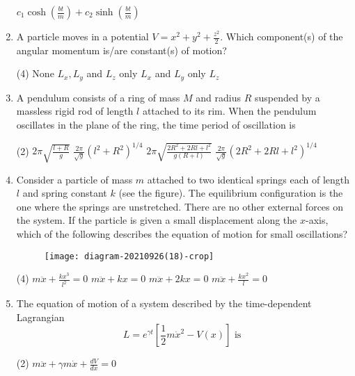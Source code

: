 \begin{enumerate}
\begin{tasks}
		\task[\textbf{D.}] $c_{1} \cosh \left(\frac{b t}{m}\right)+c_{2} \sinh \left(\frac{b t}{m}\right)$
	\end{tasks}	
	\item A particle moves in a potential $V=x^{2}+y^{2}+\frac{z^{2}}{2} .$ Which component(s) of the angular momentum is/are constant(s) of motion?
	{}
	\begin{tasks}(4)
		\task[\textbf{A.}] None
		\task[\textbf{B.}] $L_{x}, L_{y}$ and $L_{z}$
		\task[\textbf{C.}]  only $L_{x}$ and $L_{y}$
		\task[\textbf{D.}] only $L_{z}$
	\end{tasks}
	\item A pendulum consists of a ring of mass $M$ and radius $R$ suspended by a massless rigid rod of length $l$ attached to its rim. When the pendulum oscillates in the plane of the ring, the time period of oscillation is
	{}
	\begin{tasks}(2)
		\task[\textbf{A.}] $2 \pi \sqrt{\frac{l+R}{g}}$
		\task[\textbf{B.}] $\frac{2 \pi}{\sqrt{g}}\left(l^{2}+R^{2}\right)^{1 / 4}$
		\task[\textbf{C.}] $2 \pi \sqrt{\frac{2 R^{2}+2 R l+l^{2}}{g(R+l)}}$
		\task[\textbf{D.}] $\frac{2 \pi}{\sqrt{g}}\left(2 R^{2}+2 R l+l^{2}\right)^{1 / 4}$
	\end{tasks}	
	\item Consider a particle of mass $m$ attached to two identical springs each of length $l$ and spring constant $k$ (see the figure). The equilibrium configuration is the one where the springs are unstretched. There are no other external forces on the system. If the particle is given a small displacement along the $x$-axis, which of the following describes the equation of motion for small oscillations?
	{}
	\begin{figure}[H]
		\centering
		\texttt{[image: diagram-20210926(18)-crop]}
	\end{figure}
	\begin{tasks}(4)
		\task[\textbf{A.}] $m \ddot{x}+\frac{k x^{3}}{l^{2}}=0$
		\task[\textbf{B.}]  $m \ddot{x}+k x=0$
		\task[\textbf{C.}] $m \ddot{x}+2 k x=0$
		\task[\textbf{D.}] $m \ddot{x}+\frac{k x^{2}}{l}=0$
	\end{tasks}	
	\item The equation of motion of a system described by the time-dependent Lagrangian
	$$
	L=e^{\gamma t}\left[\frac{1}{2} m \dot{x}^{2}-V(x)\right] \text { is }
	$$
	{}
	\begin{tasks}(2)
		\task[\textbf{A.}] $m \ddot{x}+\gamma m \dot{x}+\frac{d V}{d x}=0$

\end{tasks}
\end{enumerate}
